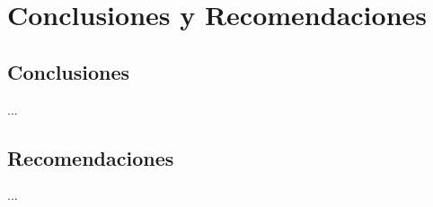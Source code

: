 \chapter{Conclusiones y Recomendaciones}
\label{chap:conclusiones}

\section{Conclusiones}
...

\section{Recomendaciones}

...